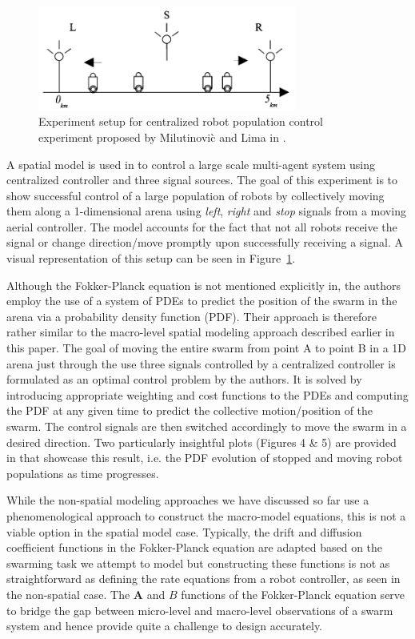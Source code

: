\documentclass[11pt, onecolumn, compsoc, letterpaper]{article}
\newcommand{\V}[1]{\mathbf{#1}}
\begin{document}
\begin{figure}[!htb]
\centering\includegraphics[width=8.5cm]{../assets/spatSignal.png}
\centering\caption{Experiment setup for centralized robot population control experiment proposed by Milutinovi\`{c} and Lima in%
.}\label{fig:signal}
\end{figure}

A spatial model is used in\cite{Milutinovi2006} to control a large scale multi-agent system using centralized controller and three signal sources. The goal of this experiment is to show successful control of a large population of robots by collectively moving them along a 1-dimensional arena using \emph{left}, \emph{right} and \emph{stop} signals from a moving aerial controller. The model accounts for the fact that not all robots receive the signal or change direction/move promptly upon successfully receiving a signal. A visual representation of this setup can be seen in Figure~\ref{fig:signal}.

Although the Fokker-Planck equation is not mentioned explicitly in\cite{Milutinovi2006}, the authors employ the use of a system of PDEs to predict the position of the swarm in the arena via a probability density function (PDF). Their approach is therefore rather similar to the macro-level spatial modeling approach described earlier in this paper. The goal of moving the entire swarm  from point A to point B in a 1D arena just through the use three signals controlled by a centralized controller is formulated as an optimal control problem by the authors. It is solved by introducing appropriate weighting and cost functions to the PDEs and computing the PDF at any given time to predict the collective motion/position of the swarm. The control signals are then switched accordingly to move the swarm in a desired direction. Two particularly insightful plots (Figures 4 \& 5) are provided in\cite{Milutinovi2006} that showcase this result, i.e. the PDF evolution of stopped and moving robot populations as time progresses.

While the non-spatial modeling approaches we have discussed so far use a phenomenological approach to construct the macro-model equations, this is not a viable option in the spatial model case. Typically, the drift and diffusion coefficient functions in the Fokker-Planck equation are adapted based on the swarming task we attempt to model but constructing these functions is not as straightforward as defining the rate equations from a robot controller, as seen in the non-spatial case. The $\V{A}$ and $B$ functions of the Fokker-Planck equation serve to bridge the gap between micro-level and macro-level observations of a swarm system and hence provide quite a challenge to design accurately.
\end{document}
